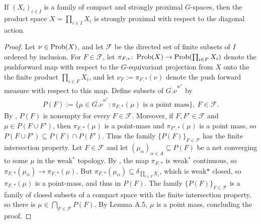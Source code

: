 %
%
\begin{proposition}\label{product of stronlgy proximal}
If $(X_{i})_{i \in I}$ is a family of compact and strongly proximal $G$-spaces, then the product space $X=\prod_{i \in I} X_i$ is strongly proximal with respect to the diagonal action.
\begin{proof}
Let $\nu \in \operatorname{Prob}(X)$, and let $\mathcal{F}$ be the directed set of finite subsets of $I$ ordered by inclusion. For $F \in \mathcal{F}$, let $\pi_{F,*} \colon \operatorname{Prob}(X) \to \operatorname{Prob}(\prod_{i \in F}X_{i})$ denote the pushforward map with respect to the $G$-equivariant projection from $X$ onto the the finite product $\prod_{i\in F }X_{i}$, and let $\nu_{F}:=\pi_{F,*}(\nu)$ denote the push forward measure with respect to this map. Define subsets of $\overline{G.\nu}^{w^*}$ by
\begin{align*}
P(F) := \{ \mu \in \overline{G.\nu}^{w^*} \colon \pi_{F,*}(\mu) \text{ is a point mass} \}, \ F \in \mathcal{F}.
\end{align*}
By , $P(F)$ is nonempty for every $F \in \mathcal{F}$. Moreover, if $F, F' \in \mathcal{F}$ and $\mu \in P(F \cup F')$, then $\pi_{F,*}(\mu)$ is a point-mass and $\pi_{F',*} (\mu)$ is a point mass, so $P(F \cup F') \subseteq P(F) \cap P(F')$. Thus the family $\{P(F)\}_{F \in \mathcal{F}}$ has the finite intersection property. Let $F \in \mathcal{F}$ and let $(\mu _{\alpha})_{\alpha \in A} \subseteq P(F)$ be a net converging to some $\mu$ in the weak$^*$ topology. By , the map $\pi_{F,*}$ is weak$^*$ continuous, so $\pi_{F,*}(\mu_{\alpha}) \to \pi_{F,*}(\mu)$. But $\pi_{F,*}(\mu_{\alpha}) \subseteq \delta_{\prod_{i \in F} X_i}$, which is weak$*$ closed, so $\pi_{F,*}(\mu)$ is a point-mass, and thus in $P(F)$. The family $\{P(F)\}_{F \in \mathcal{F}}$ is a family of closed subsets of a compact space with the finite intersection property, so there is $\mu \in \bigcap_{F \in \mathcal{F}} P(F)$. By Lemma A.5, $\mu$ is a point mass, concluding the proof.

\end{proof}
\end{proposition}
